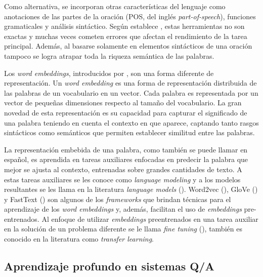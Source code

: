 Como alternativa, se incorporan otras características del lenguaje como anotaciones de las partes de la oración (POS, del inglés \textit{part-of-speech}), funciones gramaticales y análisis sintáctico. Según establece \cite{chollet-2017-deeplearningpython}, estas herramientas no son exactas y muchas veces cometen errores que afectan el rendimiento de la tarea principal. Además, al basarse solamente en elementos sintácticos de una oración tampoco se logra atrapar toda la riqueza semántica de las palabras.

Los \textit{word embeddings}, introducidos por \cite{mikolov-2013-word2vec}, son una forma diferente de representación. Un \textit{word embedding} es una forma de representación distribuida de las palabras de un vocabulario en un vector. Cada palabra es representada por un vector de pequeñas dimensiones respecto al tamaño del vocabulario. La gran novedad de esta representación es su capacidad para capturar el significado de una palabra teniendo en cuenta el contexto en que aparece, captando tanto rasgos sintácticos como semánticos que permiten establecer similitud entre las palabras.

La representación embebida de una palabra, como también se puede llamar en español, es aprendida en tareas auxiliares enfocadas en predecir la palabra que mejor se ajusta al contexto, entrenadas sobre grandes cantidades de texto. A estas tareas auxiliares se les conoce como \textit{language modeling} y a los modelos resultantes se les llama en la literatura \textit{language models} (\cite{rao-2019-nlpPython}). Word2vec (\cite{mikolov-2013-word2vec}), GloVe (\cite{pennington-2014-glove}) y FastText (\cite{mikolov-2016-fastext}) son algunos de los \textit{frameworks} que brindan técnicas para el aprendizaje de los \textit{word embeddings} y, además, facilitan el uso de \textit{embeddings} pre-entrenados. Al enfoque de utilizar \textit{embeddings} preentrenados en una tarea auxiliar en la solución de un problema diferente se le llama \textit{fine tuning} (\cite{rao-2019-nlpPython}), también es conocido en la literatura como \textit{transfer learning}.


\subsection{Aprendizaje profundo en sistemas Q/A}

